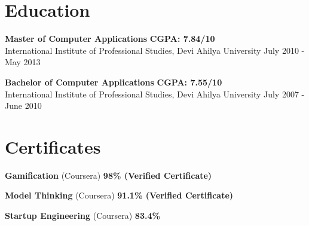 \documentclass[margin,line]{resume}
\begin{document}
\begin{resume}
    \section{\mysidestyle Education}

    \begin{list2}
	\item \textbf{Master of Computer Applications} \hspace{73mm} \textbf{CGPA: 7.84/10} \\ International Institute of Professional Studies, Devi Ahilya University \hspace{17mm} July 2010 - May 2013
	\end{list2}

	\begin{list2}
	\item \textbf{Bachelor of Computer Applications} \hspace{70mm} \textbf{CGPA: 7.55/10} \\ International Institute of Professional Studies, Devi Ahilya University \hspace{20mm} July 2007 - June 2010
	\end{list2}

    \section{\mysidestyle Certificates}

    \begin{list2}
    \item \textbf{Gamification} (Coursera) \hspace{74mm} \textbf{98\% (Verified Certificate)}
    \end{list2}

    \begin{list2}
    \item \textbf{Model Thinking} (Coursera) \hspace{65mm} \textbf{91.1\% (Verified Certificate)}
    \end{list2}

    \begin{list2}
	\item \textbf{Startup Engineering} (Coursera) \hspace{94mm} \textbf{83.4\%}
	\end{list2}


\end{resume}
\end{document}

